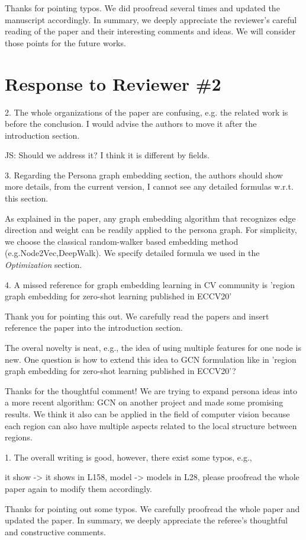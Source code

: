 \documentclass[12pt,a4paper]{article}
\newcommand{\response}[1]{{\leavevmode\noindent #1}}
\newcommand{\rcomment}[1]{%
\vspace{10pt}
\begin{tcolorbox}[colback=black!3,colframe=white!45!black]
#1
\end{tcolorbox}
}
\begin{document}
\response{%
Thanks for pointing typos. We did proofread several times and updated the manuscript accordingly.
In summary,  we deeply appreciate the reviewer's careful reading of the paper and their interesting comments and ideas. We will consider those points for the future works.
}

\newpage

\bigskip
\section*{\bf Response to Reviewer \#2}

\rcomment{%
2. The whole organizations of the paper are confusing, e.g. the related work is before the conclusion. I would advise the authors to move it after the introduction section.
}

\response{%
JS: Should we address it? I think it is different by fields.
}

\rcomment{%
3. Regarding the Persona graph embedding section, the authors should show more details, from the current version, I cannot see any detailed formulas w.r.t. this section.
}

\response{%
As explained in the paper,  any graph embedding algorithm that recognizes edge direction and weight can be readily applied to the persona graph. For simplicity, we choose the classical random-walker based embedding method (e.g.Node2Vec,DeepWalk). We specify detailed formula we used in the \emph{Optimization} section.


}

\rcomment{%
4. A missed reference for graph embedding learning in CV community is 'region graph embedding for zero-shot learning published in ECCV20'
}


\response{%
Thank you for pointing this out. We carefully read the papers and insert reference the paper into the introduction section.
}

\rcomment{%
The overal novelty is neat, e.g., the idea of using multiple features for one node is new.
One question is how to extend this idea to GCN formulation like in 'region graph embedding for zero-shot learning published in ECCV20'?
}

\response{%
Thanks for the thoughtful comment! We are trying to expand persona ideas into a more recent algorithm: GCN on another project and made some promising results. We think it also can be applied in the field of computer vision because each region can also have multiple aspects related to the local structure between regions.
}

\rcomment{%
1. The overall writing is good, however, there exist some typos, e.g.,

it show -> it shows in L158, model -> models in L28, please proofread the whole paper again to modify them accordingly.
}

\response{%
Thanks for pointing out some typos. We carefully proofread the whole paper and updated the paper.
 In summary, we deeply appreciate the referee's thoughtful and constructive comments. 
}

%

\end{document}
